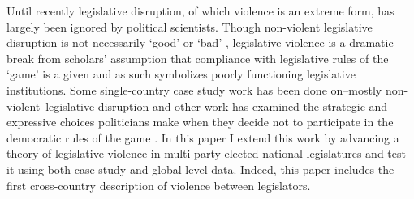\documentclass[a4paper]{article}\usepackage[]{graphicx}\usepackage[]{color}
\begin{document}
Until recently legislative disruption, of which violence is an extreme form, has largely been ignored by political scientists. Though non-violent legislative disruption is not necessarily `good' or `bad' \citep[see][for discussions of how non-violent disruption may act as a  `safety valve']{Ostrow1996,Young2002}, legislative violence is a dramatic break from scholars' assumption that compliance with legislative rules of the `game' is a given \citep{Wolfe2004} and as such symbolizes poorly functioning legislative institutions. Some single-country case study work has been done on--mostly non-violent--legislative disruption \cite[see][]{Armitage2013,Johnson2013,Ilie2013,Wolfe2004} and other work has examined the strategic and expressive choices politicians make when they decide not to participate in the democratic rules of the game \citep[e.g.][]{wilkinson2006,Beaulieu2008,Spary2013,BeaulieuForthcoming}. In this paper I extend this work by advancing a theory of legislative violence in multi-party elected national legislatures and test it using both case study and global-level data. Indeed, this paper includes the first cross-country description of violence between legislators. 
\end{document}

